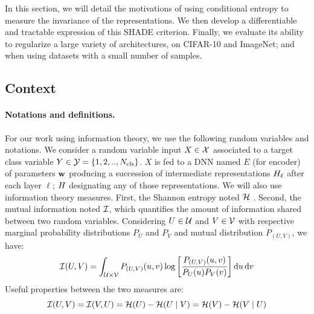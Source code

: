 In this section, we will detail the motivations of using conditional entropy to measure the invariance of the representations. We then develop a differentiable and tractable expression of this \ac{SHADE} criterion. Finally, we evaluate its ability to regularize a large variety of architectures, on CIFAR-10 and ImageNet; and when using datasets with a small number of samples.

\subsection{Context}

    \paragraph{Notations and definitions.} For our work using information theory, we use the following random variables and notations. We consider a random variable input $X\in \mathcal{X}$ associated to a target class variable $Y \in \mathcal{Y}= \{1,2,..,N_\mathrm{cls}\}$. $X$ is fed to a \ac{DNN} named $E$ (for encoder) of parameters $\mathbf{w}$ producing a succession of intermediate representations $H_\ell$ after each layer $\ell$; $H$ designating any of those representations.
    We will also use information theory measures. First, the Shannon entropy noted $\mathcal{H}$ \citep[\cf\unskip][]{element}. Second, the mutual information noted $\mathcal{I}$, which quantifies the amount of information shared between two random variables. Considering $U \in \mathcal{U}$ and $V\in \mathcal{V}$ with respective marginal probability distributions $P_U$ and $P_V$ and mutual distribution $P_{(U,V)}$, we have:
    \begin{equation}
        \mathcal{I}(U,V) = \int_{\mathcal{U}\times\mathcal{V}}P_{(U,V)}(u,v)\log\bigg[\frac{P_{(U,V)}(u,v)}{P_U(u)P_V(v)}\bigg] \,\mathrm{d} u \,\mathrm{d} v
    \end{equation}
    Useful properties between the two measures are:
    \begin{equation}
        \mathcal{I}(U,V) = \mathcal{I}(V,U) = \mathcal{H}(U) - \mathcal{H}(U\mid V) = \mathcal{H}(V) - \mathcal{H}(V\mid U)
    \end{equation}


